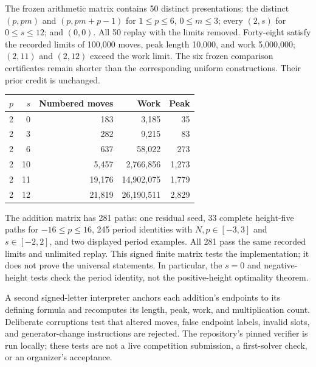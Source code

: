 \documentclass[11pt]{article}
\theoremstyle{definition}\newtheorem{definition}[theorem]{Definition}
\theoremstyle{remark}\newtheorem{remark}[theorem]{Remark}
\begin{document}
The frozen arithmetic matrix contains 50 distinct presentations: the distinct $(p,pm)$ and $(p,pm+p-1)$ for $1\le p\le6$, $0\le m\le3$; every $(2,s)$ for $0\le s\le12$; and $(0,0)$. All 50 replay with the limits removed. Forty-eight satisfy the recorded limits of 100,000 moves, peak length 10,000, and work 5,000,000; $(2,11)$ and $(2,12)$ exceed the work limit. The six frozen comparison certificates remain shorter than the corresponding uniform constructions. Their prior credit is unchanged.

\begin{center}
\small
\begin{tabular}{@{}rrrrr@{}}
\toprule
$p$ & $s$ & Numbered moves & Work & Peak\\
\midrule
2&0&183&3,185&35\\
2&3&282&9,215&83\\
2&6&637&58,022&273\\
2&10&5,457&2,766,856&1,273\\
2&11&19,176&14,902,075&1,779\\
2&12&21,819&26,190,511&2,829\\
\bottomrule
\end{tabular}
\end{center}

The addition matrix has 281 paths: one residual seed, 33 complete height-five paths for $-16\le p\le16$, 245 period identities with $N,p\in[-3,3]$ and $s\in[-2,2]$, and two displayed period examples. All 281 pass the same recorded limits and unlimited replay. This signed finite matrix tests the implementation; it does not prove the universal statements. In particular, the $s=0$ and negative-height tests check the period identity, not the positive-height optimality theorem.

A second signed-letter interpreter anchors each addition's endpoints to its defining formula and recomputes its length, peak, work, and multiplication count. Deliberate corruptions test that altered moves, false endpoint labels, invalid slots, and generator-change instructions are rejected. The repository's pinned verifier is run locally; these tests are not a live competition submission, a first-solver check, or an organizer's acceptance.
\end{document}
